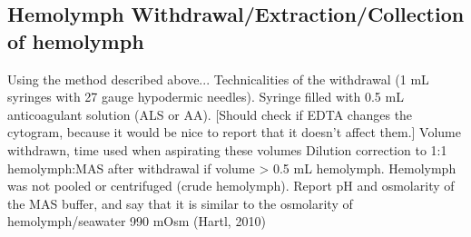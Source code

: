 \subsection{Hemolymph Withdrawal/Extraction/Collection of hemolymph}
Using the method described above...
Technicalities of the withdrawal (1 mL syringes with 27 gauge hypodermic needles).
Syringe filled with 0.5 mL anticoagulant solution (ALS or AA).
[Should check if EDTA changes the cytogram, because it would be nice to report that it doesn't affect them.] 
Volume withdrawn, time used when aspirating these volumes
Dilution correction to 1:1 hemolymph:MAS after withdrawal if volume > 0.5 mL hemolymph. 
Hemolymph was not pooled or centrifuged (crude hemolymph). Report pH and osmolarity of the MAS buffer, and say that it is similar to the osmolarity of hemolymph/seawater 990 mOsm (Hartl, 2010)


